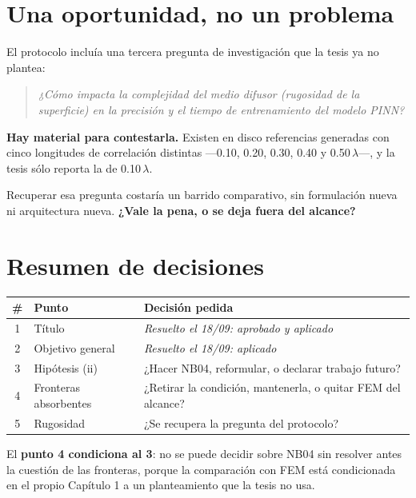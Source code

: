 \documentclass[11pt,a4paper]{article}
\renewcommand{\%}{\char`\%\relax}%
\newcommand{\cita}[1]{%
  \begin{quote}\itshape\color{gris}#1\end{quote}}
\begin{document}
\section*{Una oportunidad, no un problema}

El protocolo incluía una tercera pregunta de investigación que la tesis ya no
plantea:

\cita{¿Cómo impacta la complejidad del medio difusor (rugosidad de la
superficie) en la precisión y el tiempo de entrenamiento del modelo PINN?}

\noindent
\textbf{Hay material para contestarla.} Existen en disco referencias generadas
con cinco longitudes de correlación distintas ---0.10, 0.20, 0.30, 0.40 y
0.50\,$\lambda$---, y la tesis sólo reporta la de 0.10\,$\lambda$.

\noindent
Recuperar esa pregunta costaría un barrido comparativo, sin formulación nueva ni
arquitectura nueva. \textbf{¿Vale la pena, o se deja fuera del alcance?}

\section*{Resumen de decisiones}

\begin{tabularx}{\textwidth}{clY}
\toprule
\textbf{\#} & \textbf{Punto} & \textbf{Decisión pedida} \\
 & Título & \textit{Resuelto el 18/09: aprobado y aplicado} \\
2 & Objetivo general & \textit{Resuelto el 18/09: aplicado} \\
3 & Hipótesis (ii) & ¿Hacer NB04, reformular, o declarar trabajo futuro? \\
4 & Fronteras absorbentes & ¿Retirar la condición, mantenerla, o quitar FEM del
alcance? \\
5 & Rugosidad & ¿Se recupera la pregunta del protocolo? \\
\bottomrule
\end{tabularx}

\vspace{0.6em}
\noindent
El \textbf{punto 4 condiciona al 3}: no se puede decidir sobre NB04 sin resolver
antes la cuestión de las fronteras, porque la comparación con FEM está
condicionada en el propio Capítulo 1 a un planteamiento que la tesis no usa.
\end{document}
